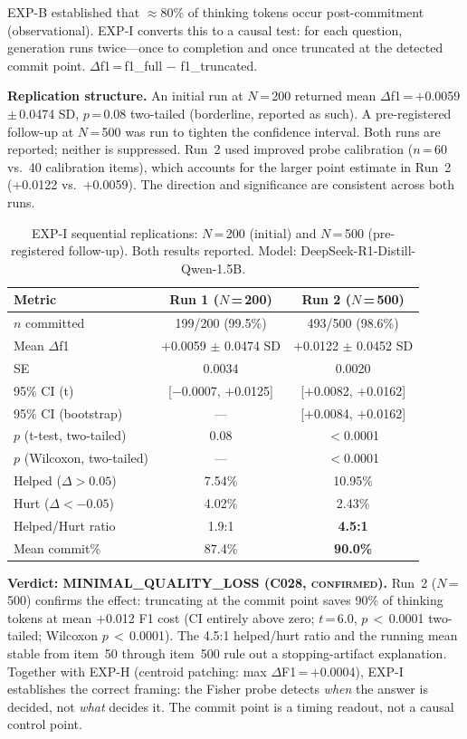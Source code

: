 \documentclass[11pt]{article}
\begin{document}
EXP-B established that $\approx$80\% of thinking tokens occur post-commitment
(observational). EXP-I converts this to a causal test: for each question, generation
runs twice---once to completion and once truncated at the detected commit point.
$\Delta$f1\,=\,f1\_full $-$ f1\_truncated.

\textbf{Replication structure.} An initial run at $N$\,=\,200 returned mean
$\Delta$f1\,=\,$+$0.0059\,$\pm$\,0.0474 SD, $p$\,=\,0.08 two-tailed (borderline,
reported as such). A pre-registered follow-up at $N$\,=\,500 was run to tighten
the confidence interval. Both runs are reported; neither is suppressed.
Run~2 used improved probe calibration ($n$\,=\,60 vs.\ 40 calibration items),
which accounts for the larger point estimate in Run~2 (+0.0122 vs.\ +0.0059).
The direction and significance are consistent across both runs.

\begin{table}[h!]
\centering
\caption{EXP-I sequential replications: $N$\,=\,200 (initial) and $N$\,=\,500
  (pre-registered follow-up). Both results reported. Model: DeepSeek-R1-Distill-Qwen-1.5B.}
\begin{tabular}{lcc}
\toprule
Metric & Run 1 ($N$\,=\,200) & Run 2 ($N$\,=\,500) \\
\midrule
$n$ committed & 199/200 (99.5\%) & 493/500 (98.6\%) \\
Mean $\Delta$f1 & $+$0.0059 $\pm$ 0.0474 SD & $+$0.0122 $\pm$ 0.0452 SD \\
SE & 0.0034 & 0.0020 \\
95\% CI (t) & [$-$0.0007, $+$0.0125] & [$+$0.0082, $+$0.0162] \\
95\% CI (bootstrap) & --- & [$+$0.0084, $+$0.0162] \\
$p$ (t-test, two-tailed) & 0.08 & $<$0.0001 \\
$p$ (Wilcoxon, two-tailed) & --- & $<$0.0001 \\
Helped ($\Delta > 0.05$) & 7.54\% & 10.95\% \\
Hurt ($\Delta < -0.05$) & 4.02\% & 2.43\% \\
Helped/Hurt ratio & 1.9:1 & \textbf{4.5:1} \\
Mean commit\% & 87.4\% & \textbf{90.0\%} \\
\bottomrule
\end{tabular}
\end{table}

\textbf{Verdict: MINIMAL\_QUALITY\_LOSS (C028, \textsc{confirmed}).}
Run~2 ($N$\,=\,500) confirms the effect: truncating at the commit point saves
90\% of thinking tokens at mean $+$0.012 F1 cost (CI entirely above zero;
$t$\,=\,6.0, $p$\,$<$\,0.0001 two-tailed; Wilcoxon $p$\,$<$\,0.0001).
The 4.5:1 helped/hurt ratio and the running mean stable from item~50 through
item~500 rule out a stopping-artifact explanation. Together with EXP-H
(centroid patching: max $\Delta$F1\,=\,$+$0.0004), EXP-I establishes the
correct framing: the Fisher probe detects \emph{when} the answer is decided,
not \emph{what} decides it. The commit point is a timing readout, not a
causal control point.
\end{document}
